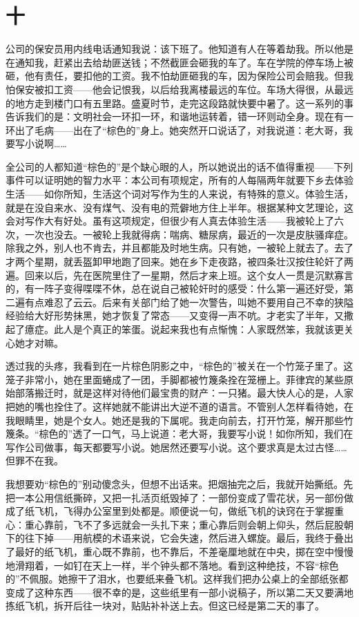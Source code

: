 \section*{十} 

公司的保安员用内线电话通知我说：该下班了。他知道有人在等着劫我。所以他是在通知我，赶紧出去给劫匪送钱；不然截匪会砸我的车了。车在学院的停车场上被砸，他有责任，要扣他的工资。我不怕劫匪砸我的车，因为保险公司会赔我。但我怕保安被扣工资——他会记恨我，以后给我离楼最远的车位。车场大得很，从最远的地方走到楼门口有五里路。盛夏时节，走完这段路就快要中暑了。这一系列的事告诉我们的是：文明社会一环扣一环，和谐地运转着，错一环则动全身。现在有一环出了毛病——出在了“棕色的”身上。她突然开口说话了，对我说道：老大哥，我要写小说啊…… 

全公司的人都知道“棕色的”是个缺心眼的人，所以她说出的话不值得重视——下列事件可以证明她的智力水平：本公司有项规定，所有的人每隔两年就要下乡去体验生活——如你所知，生活这个词对写作为生的人来说，有特殊的意义。体验生活，就是在没自来水、没有煤气、没有电的荒僻地方住上半年。根据某种文艺理论，这会对写作大有好处。虽有这项规定，但很少有人真去体验生活——我被轮上了六次，一次也没去。一被轮上我就得病：喘病、糖尿病，最近的一次是皮肤骚痒症。除我之外，别人也不肯去，并且都能及时地生病。只有她，一被轮上就去了。去了才两个星期，就丢盔卸甲地跑了回来。她在乡下走夜路，被四条壮汉按住轮奸了两遍。回来以后，先在医院里住了一星期，然后才来上班。这个女人一贯是沉默寡言的，有一阵子变得喋喋不休，总在说自己被轮奸时的感受：什么第一遍还好受，第二遍有点难忍了云云。后来有关部门给了她一次警告，叫她不要用自己不幸的狭隘经验给大好形势抹黑，她才恢复了常态——又变得一声不吭。才老实了半年，又撒起了癔症。此人是个真正的笨蛋。说起来我也有点惭愧：人家既然笨，我就该更关心她才对嘛。 

透过我的头疼，我看到在一片棕色阴影之中，“棕色的”被关在一个竹笼子里了。这笼子非常小，她在里面蜷成了一团，手脚都被竹篾条拴在笼栅上。菲律宾的某些原始部落搬迁时，就是这样对待他们最宝贵的财产：一只猪。最大快人心的是，人家把她的嘴也拴住了。这样她就不能讲出大逆不道的语言。不管别人怎样看待她，在我眼睛里，她是个女人。她还是我的下属呢。我走向前去，打开竹笼，解开那些竹篾条。“棕色的”透了一口气，马上说道：老大哥，我要写小说！如你所知，我们在写作公司做事，每天都要写小说。她居然还要写小说。这个要求真是太过古怪……但罪不在我。 

我想要劝“棕色的”别动傻念头，但想不出话来。把烟抽完之后，我就开始撕纸。先把一本公用信纸撕碎，又把一扎活页纸毁掉了：一部份变成了雪花状，另一部份做成了纸飞机，飞得办公室里到处都是。顺便说一句，做纸飞机的诀窍在于掌握重心：重心靠前，飞不了多远就会一头扎下来；重心靠后则会朝上仰头，然后屁股朝下的往下掉——用航模的术语来说，它会失速，然后进入螺旋。最后，我终于叠出了最好的纸飞机，重心既不靠前，也不靠后，不差毫厘地就在中央，掷在空中慢慢地滑翔着，一如钉在天上一样，半个钟头都不落地。看到这种绝技，不容“棕色的”不佩服。她擦干了泪水，也要纸来叠飞机。这样我们把办公桌上的全部纸张都变成了这种东西——很不幸的是，这些纸里有一部小说稿子，所以第二天又要满地拣纸飞机，拆开后往一块对，贴贴补补送上去。但这已经是第二天的事了。 


